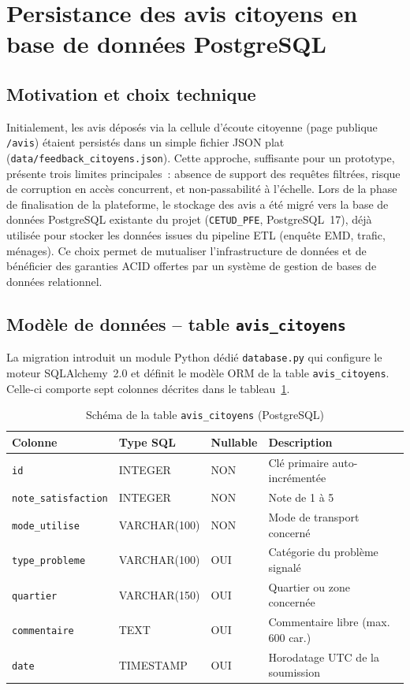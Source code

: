 \section{Persistance des avis citoyens en base de donn\'ees PostgreSQL}
\label{sec:persistance-postgresql}

\subsection{Motivation et choix technique}

Initialement, les avis d\'epos\'es via la cellule d'\'ecoute citoyenne (page publique \texttt{/avis}) \'etaient persist\'es dans un simple fichier JSON plat (\texttt{data/feedback\_citoyens.json}). Cette approche, suffisante pour un prototype, pr\'esente trois limites principales~: absence de support des requ\^etes filtr\'ees, risque de corruption en acc\`es concurrent, et non-passabilit\'e \`a l'\'echelle. Lors de la phase de finalisation de la plateforme, le stockage des avis a \'et\'e migr\'e vers la base de donn\'ees PostgreSQL existante du projet (\texttt{CETUD\_PFE}, PostgreSQL~17), d\'ej\`a utilis\'ee pour stocker les donn\'ees issues du pipeline ETL (enqu\^ete EMD, trafic, m\'enages). Ce choix permet de mutualiser l'infrastructure de donn\'ees et de b\'en\'eficier des garanties ACID offertes par un syst\`eme de gestion de bases de donn\'ees relationnel.

\subsection{Mod\`ele de donn\'ees -- table \texttt{avis\_citoyens}}

La migration introduit un module Python d\'edi\'e \texttt{database.py} qui configure le moteur SQLAlchemy~2.0 et d\'efinit le mod\`ele ORM de la table \texttt{avis\_citoyens}. Celle-ci comporte sept colonnes d\'ecrites dans le tableau~\ref{tab:schema-avis}.

\begin{table}[H]
\centering
\caption{Sch\'ema de la table \texttt{avis\_citoyens} (PostgreSQL)}
\label{tab:schema-avis}
\begin{tabular}{|l|l|l|l|}
\hline
\textbf{Colonne} & \textbf{Type SQL} & \textbf{Nullable} & \textbf{Description} \\
\hline
\texttt{id} & INTEGER & NON & Cl\'e primaire auto-incr\'ement\'ee \\
\texttt{note\_satisfaction} & INTEGER & NON & Note de 1 \`a 5 \\
\texttt{mode\_utilise} & VARCHAR(100) & NON & Mode de transport concern\'e \\
\texttt{type\_probleme} & VARCHAR(100) & OUI & Cat\'egorie du probl\`eme signal\'e \\
\texttt{quartier} & VARCHAR(150) & OUI & Quartier ou zone concern\'ee \\
\texttt{commentaire} & TEXT & OUI & Commentaire libre (max. 600 car.) \\
\texttt{date} & TIMESTAMP & OUI & Horodatage UTC de la soumission \\
\hline
\end{tabular}
\end{table}

